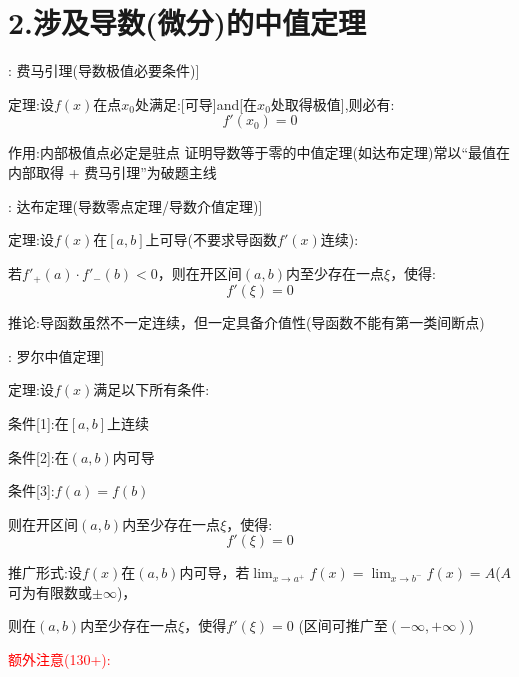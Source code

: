 \documentclass[11pt,a4paper,UTF8]{ctexart}
\begin{document}
\section{2.涉及导数(微分)的中值定理}

\begin{thmbox}[定理[1]: 费马引理(导数极值必要条件)]

定理:设$f(x)$在点$x_0$处满足:[可导]and[在$x_0$处取得极值],则必有:
\begin{equation*}
f'(x_0) = 0
\end{equation*}


  作用:内部极值点必定是驻点 证明导数等于零的中值定理(如达布定理)常以“最值在内部取得 + 费马引理”为破题主线 

\end{thmbox}
\begin{thmbox}[定理[2]: 达布定理(导数零点定理/导数介值定理)]

定理:设$f(x)$在$[a, b]$上可导(不要求导函数$f'(x)$连续):

  若$f'_+(a) \cdot f'_-(b) < 0$，则在开区间$(a, b)$内至少存在一点$\xi$，使得:
\begin{equation*}
f'(\xi) = 0
\end{equation*}

  
推论:导函数虽然不一定连续，但一定具备介值性(导函数不能有第一类间断点) 

\end{thmbox}
\begin{thmbox}[定理[3]: 罗尔中值定理]

定理:设$f(x)$满足以下所有条件:

  条件[1]:在$[a, b]$上连续

  条件[2]:在$(a, b)$内可导

  条件[3]:$f(a) = f(b)$ 

则在开区间$(a, b)$内至少存在一点$\xi$，使得:
\begin{equation*}
f'(\xi) = 0
\end{equation*}


推广形式:设$f(x)$在$(a, b)$内可导，若$\lim_{x \to a^+} f(x) = \lim_{x \to b^-} f(x) = A$($A$可为有限数或$\pm\infty$)，

则在$(a, b)$内至少存在一点$\xi$，使得$f'(\xi) = 0$ (区间可推广至$(-\infty, +\infty)$) 

\textcolor{red}{额外注意(130+):}

\end{thmbox}
\end{document}
